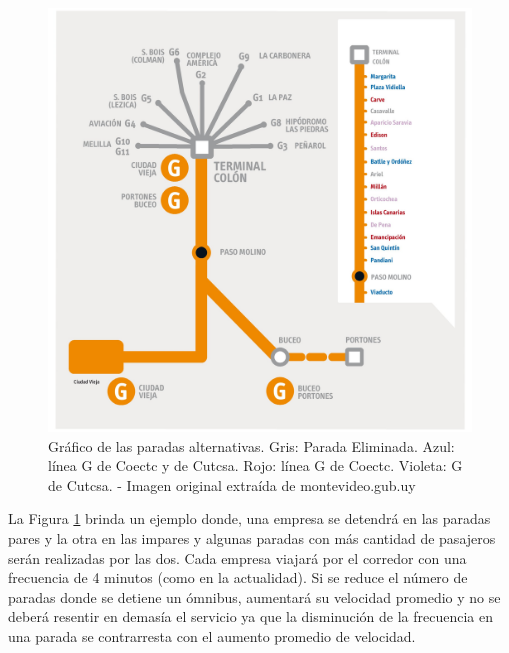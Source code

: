\begin{figure}[H]
	\centering
	\includegraphics[width=0.9\linewidth]{Figures/paradas_alternativas}
	\caption[Gráfico de las paradas alternativas.]{Gráfico de las paradas alternativas. Gris: Parada Eliminada. Azul: línea G de Coectc y de Cutcsa. Rojo: línea G de Coectc. Violeta: G de Cutcsa. - Imagen original extraída de montevideo.gub.uy}
	\label{fig:paradas_alternadas}
\end{figure}

La Figura \ref{fig:paradas_alternadas} brinda un ejemplo donde, una empresa se detendrá en las paradas pares y la otra en las impares y algunas paradas con más cantidad de pasajeros serán realizadas por las dos. Cada empresa viajará por el corredor con una frecuencia de 4 minutos (como en la actualidad). Si se reduce el número de paradas donde se detiene un ómnibus, aumentará su velocidad promedio y no se deberá resentir en demasía el servicio ya que la disminución de la frecuencia en una parada se contrarresta con el aumento promedio de velocidad.




